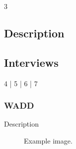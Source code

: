 \documentclass[12pt]{article} %
\begin{document}
3 


\subsection{Description} %

\subsection{Interviews} %

4 | 5 | 6 | 7

\subsubsection{WADD} %

Description

\begin{figure}[H] %
\caption{Example image.}
\label{fig:speciation}
\end{figure}

\end{document}

